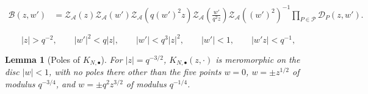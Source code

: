 \documentclass[10pt,a4paper]{amsart}
\newtheorem{lemma}{Lemma}
\newcommand{\A}{\mathcal{A}}
\begin{document}
\begin{align}
\mathcal{B}(z,w')
&=
\mathcal Z_{\A}(z)
\mathcal Z_{\A}(w')
\mathcal Z_{\A}(q(w')^2z)
\mathcal Z_{\A}\!\left(\frac{w'}{q^2z}\right)
\mathcal Z_{\A}((w')^2)^{-1}
\prod_{P\in\mathcal P}\mathcal{D}_P(z,w').
\end{align}

\begin{equation}
|z|>q^{-2},
\qquad
|w'|^2<q|z|,
\qquad
|w'|<q^3|z|^2,
\qquad
|w'|<1,
\qquad
|w'z|<q^{-1},
\end{equation}

\begin{lemma}[Poles of $K_{N,\bullet}$]
\label{lem:K-poles}
For $|z|=q^{-3/2}$, $K_{N,\bullet}(z,\cdot)$ is meromorphic on the disc
$|w|<1$, with no poles there other than the five points $w=0$,
$w=\pm z^{1/2}$ of modulus $q^{-3/4}$, and $w=\pm q^{2}z^{3/2}$ of modulus
$q^{-1/4}$.
\end{lemma}
\end{document}
